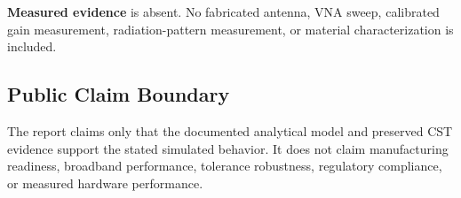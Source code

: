 \textbf{Measured evidence} is absent. No fabricated antenna, VNA sweep, calibrated
gain measurement, radiation-pattern measurement, or material characterization is
included.

\subsection{Public Claim Boundary}

The report claims only that the documented analytical model and preserved CST evidence
support the stated simulated behavior. It does not claim manufacturing readiness,
broadband performance, tolerance robustness, regulatory compliance, or measured
hardware performance.
